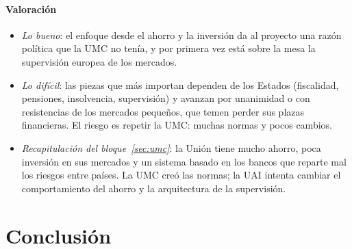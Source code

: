 \documentclass[11pt]{article}
\begin{document}
\paragraph{Valoración}

\begin{itemize}
\item \emph{Lo bueno}: el enfoque desde el ahorro y la inversión da al proyecto una razón política que la UMC no tenía, y por primera vez está sobre la mesa la supervisión europea de los mercados.
\item \emph{Lo difícil}: las piezas que más importan dependen de los Estados (fiscalidad, pensiones, insolvencia, supervisión) y avanzan por unanimidad o con resistencias de los mercados pequeños, que temen perder sus plazas financieras. El riesgo es repetir la UMC: muchas normas y pocos cambios.
\end{itemize}

\begin{itemize}
\item \emph{Recapitulación del bloque~\ref{sec:umc}}: la Unión tiene mucho ahorro, poca inversión en sus mercados y un sistema basado en los bancos que reparte mal los riesgos entre países. La UMC creó las normas; la UAI intenta cambiar el comportamiento del ahorro y la arquitectura de la supervisión.
\end{itemize}

\section*{Conclusión}
\end{document}
